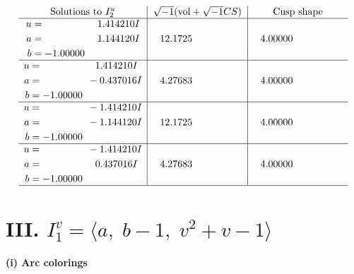 \documentclass[1p]{elsarticle_modified}
\theoremstyle{definition}
\newcommand{\I}{\sqrt{-1}}
\begin{document}
$$\begin{array}{c|c|c}  
\text{Solutions to }I^u_{2}& \I (\text{vol} + \sqrt{-1}CS) & \text{Cusp shape}\\
 \hline 
\begin{aligned}
u &= \phantom{-0.000000 -}1.414210 I \\
a &= \phantom{-0.000000 -}1.144120 I \\
b &= -1.00000\phantom{ +0.000000I}\end{aligned}
 & \phantom{-}12.1725\phantom{ +0.000000I} & \phantom{-}4.00000\phantom{ +0.000000I} \\ \hline\begin{aligned}
u &= \phantom{-0.000000 -}1.414210 I \\
a &= \phantom{-0.000000 } -0.437016 I \\
b &= -1.00000\phantom{ +0.000000I}\end{aligned}
 & \phantom{-}4.27683\phantom{ +0.000000I} & \phantom{-}4.00000\phantom{ +0.000000I} \\ \hline\begin{aligned}
u &= \phantom{-0.000000 } -1.414210 I \\
a &= \phantom{-0.000000 } -1.144120 I \\
b &= -1.00000\phantom{ +0.000000I}\end{aligned}
 & \phantom{-}12.1725\phantom{ +0.000000I} & \phantom{-}4.00000\phantom{ +0.000000I} \\ \hline\begin{aligned}
u &= \phantom{-0.000000 } -1.414210 I \\
a &= \phantom{-0.000000 -}0.437016 I \\
b &= -1.00000\phantom{ +0.000000I}\end{aligned}
 & \phantom{-}4.27683\phantom{ +0.000000I} & \phantom{-}4.00000\phantom{ +0.000000I}\\
 \hline 
 \end{array}$$\newpage\newpage\renewcommand{\arraystretch}{1}
\centering \section*{III. $I^v_{1}= \langle a,\;b-1,\;v^2+v-1 \rangle$}
\flushleft \textbf{(i) Arc colorings}\\
\end{document}
